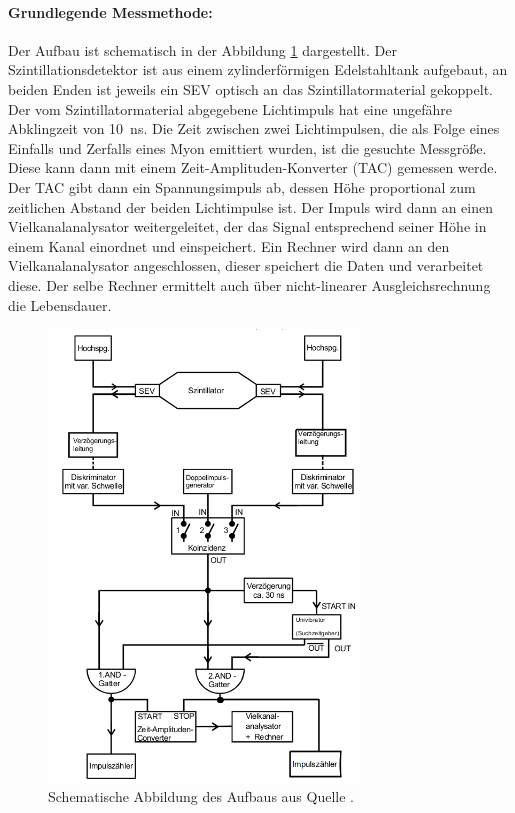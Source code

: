 \paragraph{Grundlegende Messmethode:}
Der Aufbau ist schematisch in der Abbildung \ref{fig:aufbau} dargestellt. Der Szintillationsdetektor ist aus 
einem zylinderförmigen Edelstahltank aufgebaut, an beiden Enden ist jeweils ein SEV optisch an das 
Szintillatormaterial gekoppelt. Der vom Szintillatormaterial abgegebene Lichtimpuls hat eine ungefähre  Abklingzeit von 
\SI{10}{\nano\second}. Die Zeit zwischen zwei Lichtimpulsen, die als Folge eines Einfalls und Zerfalls eines Myon 
emittiert wurden, ist die gesuchte Messgröße. Diese kann dann mit einem Zeit-Amplituden-Konverter (TAC) 
gemessen werde. Der TAC gibt dann ein Spannungsimpuls ab, dessen Höhe proportional zum zeitlichen Abstand der 
beiden Lichtimpulse ist. Der Impuls wird dann an einen Vielkanalanalysator weitergeleitet, der das Signal 
entsprechend seiner Höhe in einem Kanal einordnet und einspeichert. Ein Rechner wird dann an den 
Vielkanalanalysator angeschlossen, dieser speichert die Daten und verarbeitet diese. Der 
selbe Rechner ermittelt auch 
über nicht-linearer Ausgleichsrechnung die Lebensdauer.

\begin{figure}
  \centering
  \includegraphics[height=12cm]{pics/AufbauB.png}
  \caption{Schematische Abbildung des Aufbaus aus Quelle \cite{Anleitung}.}
  \label{fig:aufbau}
\end{figure}

